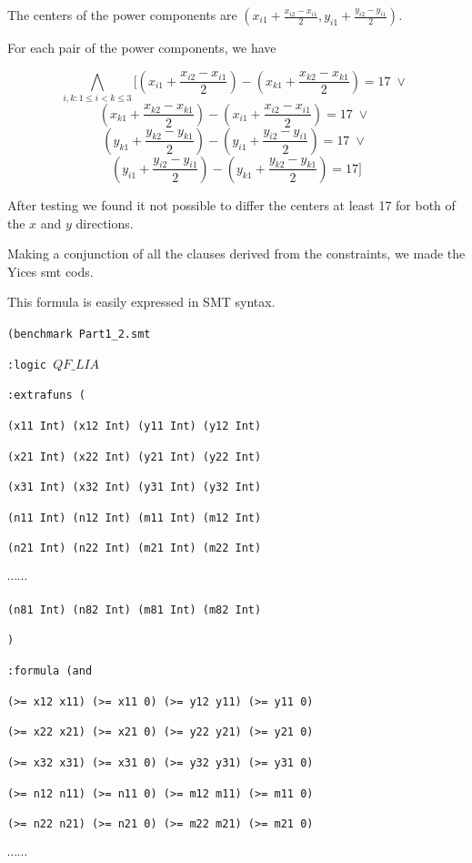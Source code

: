 \documentclass[11pt]{article}
\begin{document}
{\begin{description}
  The centers of the power components are $(x_{i1} + \frac{x_{i2} - x_{i1}}{2}, y_{i1} + \frac{y_{i2} - y_{i1}}{2} )$.

  For each pair of the power components, we have

  \[  \bigwedge_{i,k: 1 \leq i < k \leq 3}
  [ (x_{i1} + \frac{x_{i2} - x_{i1}}{2}) - (x_{k1} + \frac{x_{k2} - x_{k1}}{2}) = 17 \; \vee \; \]
  \[ (x_{k1} + \frac{x_{k2} - x_{k1}}{2}) - (x_{i1} + \frac{x_{i2} - x_{i1}}{2}) = 17 \; \vee \; \]
  \[ (y_{k1} + \frac{y_{k2} - y_{k1}}{2}) - (y_{i1} + \frac{y_{i2} - y_{i1}}{2}) = 17 \; \vee \; \]
  \[ (y_{i1} + \frac{y_{i2} - y_{i1}}{2}) - (y_{k1} + \frac{y_{k2} - y_{k1}}{2}) = 17 ] \]

  After testing we found it not possible to differ the centers at least 17 for both of the $x$ and $y$ directions.
\end{description}

Making a conjunction of all the clauses derived from the constraints, we made the Yices smt cods.

This formula is easily expressed in SMT syntax.

{\footnotesize

{\tt (benchmark Part1\_2.smt}

{\tt :logic $QF\_LIA$}

{\tt :extrafuns (}

{\tt (x11 Int) (x12 Int) (y11 Int) (y12 Int)}

{\tt (x21 Int) (x22 Int) (y21 Int) (y22 Int)}

{\tt (x31 Int) (x32 Int) (y31 Int) (y32 Int)}

{\tt (n11 Int) (n12 Int) (m11 Int) (m12 Int)}

{\tt (n21 Int) (n22 Int) (m21 Int) (m22 Int)}

$\cdots \cdots$

{\tt (n81 Int) (n82 Int) (m81 Int) (m82 Int)}

{\tt )}

{\tt :formula (and}

{\tt (>= x12 x11) (>= x11 0) (>= y12 y11) (>= y11 0)}

{\tt (>= x22 x21) (>= x21 0) (>= y22 y21) (>= y21 0)}

{\tt (>= x32 x31) (>= x31 0) (>= y32 y31) (>= y31 0)}

{\tt (>= n12 n11) (>= n11 0) (>= m12 m11) (>= m11 0)}

{\tt (>= n22 n21) (>= n21 0) (>= m22 m21) (>= m21 0)}

$\cdots \cdots$

}}
\end{document}
